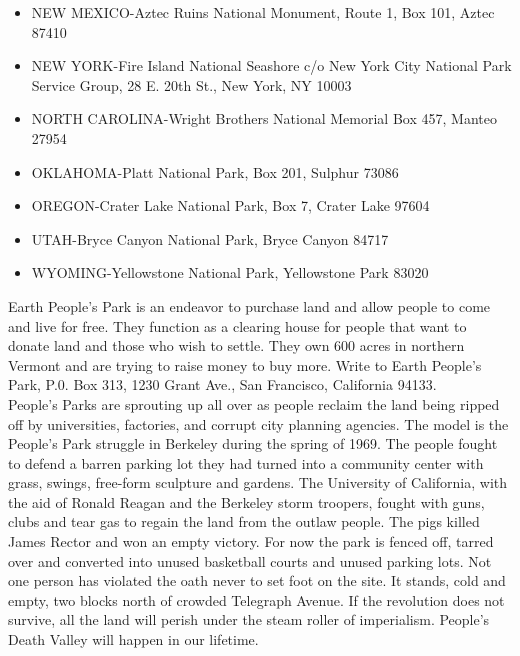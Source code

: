 \documentclass[11pt,twoside,a4paper]{book}
\begin{document}
\begin{small}
\begin{itemize}
	\item NEW MEXICO-Aztec Ruins National Monument, Route 1, Box 101, Aztec 87410 
	\item NEW YORK-Fire Island National Seashore c/o New York City National Park Service Group, 28 E. 20th St., New York, NY 10003 
	\item NORTH CAROLINA-Wright Brothers National Memorial Box 457, Manteo 27954 
	\item OKLAHOMA-Platt 	National Park, Box 201, Sulphur 73086 
	\item OREGON-Crater Lake National Park, Box 7, Crater Lake 97604 
	\item UTAH-Bryce Canyon National Park, Bryce Canyon 84717 
	\item WYOMING-Yellowstone National Park, Yellowstone Park 83020
\end{itemize} \end{small}

	
Earth People's Park is an endeavor to purchase land and allow people to come and live for free. They function as a clearing house for people that want to donate land and those who wish to settle. They own 600 acres in northern Vermont and are trying to raise money to buy more. Write to Earth People's Park, P.0. Box 313, 1230 Grant Ave., San Francisco, California 94133.~\\

People's Parks are sprouting up all over as people reclaim the land being ripped off by universities, factories, and corrupt city planning agencies. The model is the People's Park struggle in Berkeley during the spring of 1969. The people fought to defend a barren parking lot they had turned into a community center with grass, swings, free-form sculpture and gardens. The University of California, with the aid of Ronald Reagan and the Berkeley storm troopers, fought with guns, clubs and tear gas to regain the land from the outlaw people. The pigs killed James Rector and won an empty victory. For now the park is fenced off, tarred over and converted into unused basketball courts and unused parking lots. Not one person has violated the oath never to set foot on the site. It stands, cold and empty, two blocks north of crowded Telegraph Avenue. If the revolution does not survive, all the land will perish under the steam roller of imperialism. People's Death Valley will happen in our lifetime.
\end{document}
